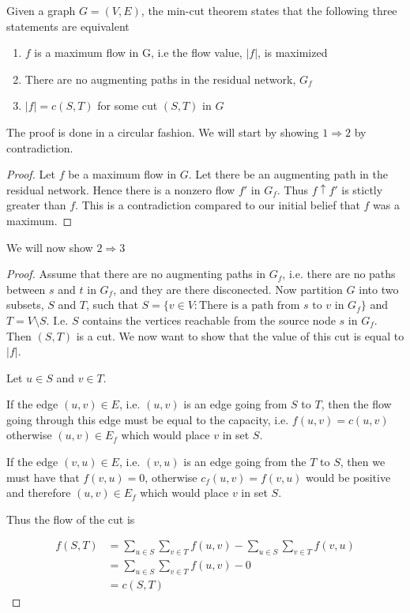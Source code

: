 \documentclass[10pt]{article}
\begin{document}
Given a graph $G = (V,E)$, the min-cut theorem states that the following three statements are equivalent


\begin{enumerate}
  \item $f$ is a maximum flow in G, i.e the flow value, $|f|$, is maximized
  \item There are no augmenting paths in the residual network, $G_f$
  \item $|f| = c(S,T)$ for some cut $(S,T)$ in $G$
\end{enumerate}


The proof is done in a circular fashion. We will start by showing $1 \Rightarrow 2$ by contradiction. 

\begin{proof}
Let $f$ be a maximum flow in $G$. Let there be an augmenting path in the residual network. Hence there is a nonzero flow $f'$ in $G_f$. Thus $f \uparrow f'$ is stictly greater than $f$. This is a contradiction compared to our initial belief that $f$ was a maximum.
\end{proof} 

We will now show $2 \Rightarrow 3$
\begin{proof}
Assume that there are no augmenting paths in $G_f$, i.e. there are no paths between $s$ and $t$ in $G_f$, and they are there disconected. Now partition $G$ into two subsets, $S$ and $T$, such that $S = \{v \in V: \text{There is a path from $s$ to $v$ in $G_f$}\}$ and $T = V\setminus S$. I.e. $S$ contains the vertices reachable from the source node $s$ in $G_f$. Then $(S,T)$ is a cut. We now want to show that the value of this cut is equal to $|f|$. 

Let $u \in S$ and $v \in T$. 

If the edge $(u,v) \in E$, i.e. $(u,v)$ is an edge going from $S$ to $T$, then the flow going through this edge must be equal to the capacity, i.e. $f(u,v) = c(u,v)$ otherwise $(u,v) \in E_f$ which would place $v$ in set $S$. 

If the edge $(v,u) \in E$, i.e. $(v,u)$ is an edge going from the $T$ to $S$, then we must have that $f(v,u)=0$, otherwise $c_f(u,v) = f(v,u)$ would be positive and therefore $(u,v) \in E_f$ which would place $v$ in set $S$.

Thus the flow of the cut is

\begin{align*}
 f(S,T) &= \sum_{u \in S} \sum_{v \in T} f(u,v) - \sum_{u \in S} \sum_{v \in T} f(v,u) \\
        &= \sum_{u \in S} \sum_{v \in T} f(u,v) - 0 \\ 
        &= c(S,T) 
\end{align*}
\end{proof} 
\end{document}
